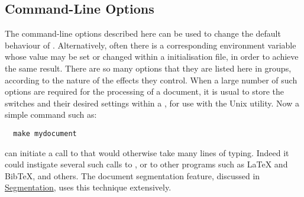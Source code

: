 \subsection{Command-Line Options\label{options}}%
%
%
%
%
%
\html{\\}\noindent
The command-line options described here can be used to change the
default behaviour of \latextohtml.
Alternatively, often there is a corresponding environment variable
whose value may be set or changed within a 
initialisation file, in order to achieve the same result.\html{\\}
There are so many options that they are listed here in groups,
according to the nature of the effects they control.
When a large number of such options are required for the processing of a document,
it is usual to store the switches and their desired settings within a ,
for use with the Unix  utility. Now a simple command such as:
\begin{verbatim}
  make mydocument
\end{verbatim}
can initiate a call to  that would otherwise take many lines of typing.
Indeed it could instigate several such calls to \latextohtml, or to other programs
such as \LaTeX{} and Bib\TeX,  and others.
The document segmentation feature, discussed in
\hyperref{another section}{Section~}{}{Segmentation},
uses this technique extensively.


